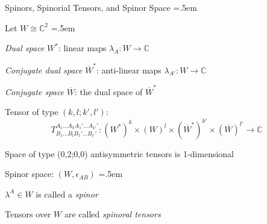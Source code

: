 \documentclass[xcolor={dvipsnames}]{beamer}
\let\olditemize=\itemize
\let\endolditemize=\enditemize
\renewenvironment{itemize}{\olditemize \itemsep=.5em }{\endolditemize}
\begin{document}
\begin{frame}{Spinors, Spinorial Tensors, and Spinor Space}
    \begin{itemize}
        \item<2-> Let $W \cong \mathbb{C}^2$
        \begin{itemize}
            \item<3-> \textit{Dual space} $W^*$: linear maps $\lambda_A : W \rightarrow \mathbb{C}$
            \item<4-> \textit{Conjugate dual space} $\overline{W}^*$: anti-linear maps $\lambda_{A'} : W \rightarrow \mathbb{C}$ 
            \item<5-> \textit{Conjugate space} $\overline{W}$: the dual space of $\overline{W}^*$ 
        \end{itemize}
        \item<6-> Tensor of type $(k,l;k',l')$:
        \[ T_{B_1\dots B_l B_1'\dots B_{l'}'}^{A_1\dots A_k A_1'\dots A_{k'}'}: \left(W^*\right)^k \times \left(W\right)^l \times \left(\overline{W}^*\right)^{k'} \times \left(\overline{W}\right)^{l'} \rightarrow \mathbb{C} \]
        \item<7-> Space of type (0,2;0,0) antisymmetric tensors is 1-dimensional
        \item<8-> Spinor space: $(W, \epsilon_{AB})$
        \begin{itemize}
            \item<9-> $\lambda^A \in W$ is called a \textit{spinor}
            \item<10-> Tensors over $W$ are called \textit{spinoral tensors}
        \end{itemize}
    \end{itemize}
\end{frame}
\end{document}
